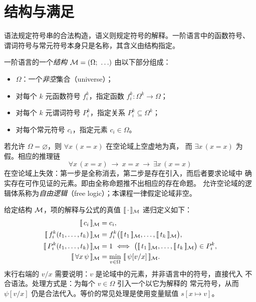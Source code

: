 \section{结构与满足}\label{sec:semantics}

语法规定符号串的合法构造，语义则规定符号的解释。一阶语言中的函数符号、
谓词符号与常元符号本身只是名称，其含义由结构指定。

\begin{definition}[结构]
一阶语言的一个\emph{结构} $\M=(\Omega;\ \ldots)$ 由以下部分组成：
\begin{itemize}[leftmargin=1.3em,itemsep=1pt]
  \item {} $\Omega$：一个\emph{非空}集合（universe）；
  \item 对每个 $k$ 元函数符号 $f_i^k$，指定函数 $f_i^k:\Omega^k\to\Omega$；
  \item 对每个 $k$ 元谓词符号 $P_i^k$，指定关系 $P_i^k\subseteq\Omega^k$；
  \item 对每个常元符号 $c_i$，指定元素 $c_i\in\Omega$。
\end{itemize}
\end{definition}

\begin{remark}[论域非空的理由]
若允许 $\Omega=\varnothing$，则 $\forall x\,(x=x)$ 在空论域上空虚地为真，
而 $\exists x\,(x=x)$ 为假。相应的推理链
\[
  \forall x\,(x=x)\ \longrightarrow\ x=x\ \longrightarrow\ \exists x\,(x=x)
\]
在空论域上失效：第一步是全称消去，第二步是存在引入，而后者要求论域中
确实存在可作见证的元素。即由全称命题推不出相应的存在命题。
允许空论域的逻辑体系称为\emph{自由逻辑}（free logic）；本课程一律假定论域非空。
\end{remark}

给定结构 $\mathcal{M}$，项的解释与公式的真值 $[\![\,\cdot\,]\!]_{\mathcal{M}}$ 递归定义如下：
\begin{align*}
  \sem{c_i}_{\M} &= c_i,\\
  \sem{f_i^k(t_1,\ldots,t_k)}_{\M} &= f_i^k\bigl(\sem{t_1}_{\M},\ldots,\sem{t_k}_{\M}\bigr),\\
  \sem{P_i^k(t_1,\ldots,t_k)}_{\M} &= 1
    \ \Longleftrightarrow\ \bigl(\sem{t_1}_{\M},\ldots,\sem{t_k}_{\M}\bigr)\in P_i^k,\\
  \sem{\forall x\,\psi}_{\M} &= \min_{v\in\Omega}\ \sem{\psi[v/x]}_{\M}.
\end{align*}
末行右端的 $v/x$ 需要说明：$v$ 是论域中的元素，并非语言中的符号，直接代入
不合语法。处理方式是：为每个 $v\in\Omega$ 引入一个以它为解释的
常元符号，从而 $\psi[v/x]$ 仍是合法代入。等价的常见处理是使用变量赋值
$s[x\mapsto v]$。

